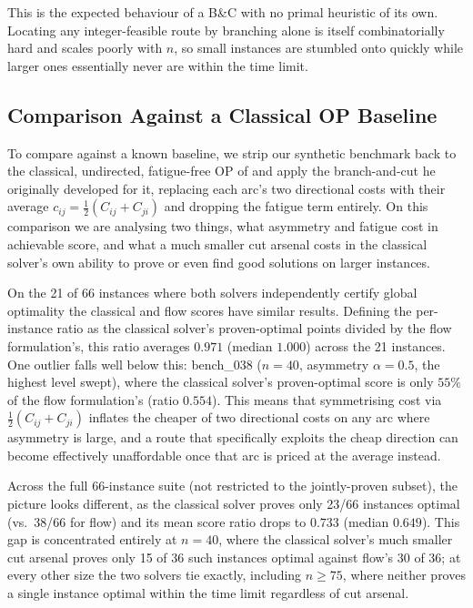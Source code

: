 \documentclass[11pt,a4paper]{article}
\begin{document}
This is the expected behaviour of a B\&C with no primal heuristic of its own. Locating any integer-feasible route by branching alone is itself combinatorially hard and scales poorly with $n$, so small instances are stumbled onto quickly while larger ones essentially never are within the time limit.

\subsection{Comparison Against a Classical OP Baseline}
\label{sec:classical_baseline}

To compare against a known baseline, we strip our synthetic benchmark back to the classical, undirected, fatigue-free OP of \citet{fischetti1998solving} and apply the branch-and-cut he originally developed for it, replacing each arc's two directional costs with their average $c_{ij} = \tfrac{1}{2}(C_{ij} + C_{ji})$ and dropping the fatigue term entirely.
On this comparison we are analysing two things, what asymmetry and fatigue cost in achievable score, and what a much smaller cut arsenal costs in the classical solver's own ability to prove or even find good solutions on larger instances.

On the 21 of 66 instances where both solvers independently certify global optimality the classical and flow scores have similar results. Defining the per-instance ratio as the classical solver's proven-optimal points divided by the flow formulation's, this ratio averages $0.971$ (median $1.000$) across the 21 instances.
One outlier falls well below this: bench\_038 ($n=40$, asymmetry $\alpha = 0.5$, the highest level swept), where the classical solver's proven-optimal score is only $55\%$ of the flow formulation's (ratio $0.554$).
This means that symmetrising cost via $\tfrac{1}{2}(C_{ij}+C_{ji})$ inflates the cheaper of two directional costs on any arc where asymmetry is large, and a route that specifically exploits the cheap direction can become effectively unaffordable once that arc is priced at the average instead.

Across the full 66-instance suite (not restricted to the jointly-proven subset), the picture looks different, as the classical solver proves only 23/66 instances optimal (vs.\ 38/66 for flow) and its mean score ratio drops to $0.733$ (median $0.649$).
This gap is concentrated entirely at $n=40$, where the classical solver's much smaller cut arsenal proves only 15 of 36 such instances optimal against flow's 30 of 36; at every other size the two solvers tie exactly, including $n \geq 75$, where neither proves a single instance optimal within the time limit regardless of cut arsenal.
\end{document}
